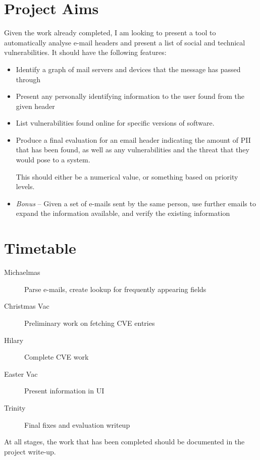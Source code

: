 \documentclass{article}
\begin{document}
\section{Project Aims}
Given the work already completed, I am looking to present a tool to automatically analyse e-mail headers and present a list of social and technical vulnerabilities.  It should have the following features:
\begin{itemize}
\item Identify a graph of mail servers and devices that the message has passed through
\item Present any personally identifying information to the user found from the given header
\item List vulnerabilities found online for specific versions of software.
\item Produce a final evaluation for an email header indicating the amount of PII that has been found, as well as any vulnerabilities and the threat that they would pose to a system.

This should either be a numerical value, or something based on priority levels.
\item \emph{Bonus} -- Given a set of e-mails sent by the same person, use further emails to expand the information available, and verify the existing information
\end{itemize}
\section{Timetable}
\begin{description}
\item[Michaelmas] Parse e-mails, create lookup for frequently appearing fields
\item[Christmas Vac] Preliminary work on fetching CVE entries
\item[Hilary] Complete CVE work
\item[Easter Vac] Present information in UI
\item[Trinity] Final fixes and evaluation writeup
\end{description}
At all stages, the work that has been completed should be documented in the project write-up.


\end{document}
